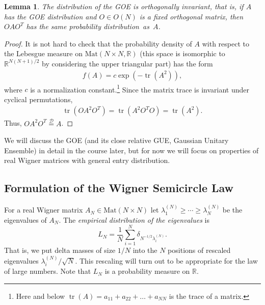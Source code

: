 \documentclass[letterpaper,11pt,oneside,reqno]{amsart}
\numberwithin{equation}{section}
\newtheorem{lemma}[proposition]{Lemma}
\theoremstyle{definition}
\begin{document}
\begin{lemma}
	The distribution of the GOE is orthogonally invariant, that is,
	if $A$ has the GOE distribution and $O\in O(N)$ is a fixed
	orthogonal matrix, then $OAO^{T}$ has the same probability distribution~as~$A$.
\end{lemma}
\begin{proof}
	It is not hard to check that the
	probability density of $A$ with respect to the 
	Lebesgue measure on $\mathrm{Mat}(N\times N,\mathbb R)$
	(this space is isomorphic to $\mathbb{R}^{N(N+1)/2}$
	by considering the upper triangular part)
	has the form
	\begin{align*}
		f(A)=c \exp(-\mathop{\mathrm{tr}}(A^2)),
	\end{align*}
	where $c$ is a normalization constant.\footnote{Here 
	and below $\mathop{\mathrm{tr}}(A)=a_{11}+a_{22}+\ldots+a_{NN}$ 
	is the trace of a matrix.}  Since the matrix trace
	is invariant under cyclical permutations, 
	\begin{align*}
		\mathop{\mathrm{tr}}(OA^2O^{T})
		=\mathop{\mathrm{tr}}(A^2O^{T}O)
		=\mathop{\mathrm{tr}}(A^2).
	\end{align*}
	Thus, $OA^2O^{T}\stackrel{\mathcal D}{=} A$.
\end{proof}

We will discuss the GOE (and its close relative GUE, Gaussian Unitary Ensemble)
in detail in the course later, but for now we will focus on 
properties of real Wigner matrices with general entry distribution.


\subsection{Formulation of the Wigner Semicircle Law} %
\label{sub:formulation_of_the_wigner_semicircle_law}

For a real Wigner matrix $A_N\in\mathrm{Mat}(N\times N)$ let
$\lambda_1^{(N)}\geq \cdots \geq \lambda_N^{(N)}$ be the eigenvalues of $A_N$.
The \emph{empirical distribution of the eigenvalues} is
\begin{equation}\label{EmpiricalDistributionOfEigenvalues}
	L_N=\frac{1}{N}\sum_{i=1}^N \delta_{N^{-1/2}\lambda_{i}^{(N)}}.
\end{equation}
That is, we put delta masses of size $1/N$ into the
$N$ positions of rescaled eigenvalues 
$\lambda_{i}^{(N)}/\sqrt N$. This rescaling will turn out to be appropriate for the 
law of large numbers.
Note that $L_N$ is a probability measure on $\mathbb{R}$.
\end{document}
